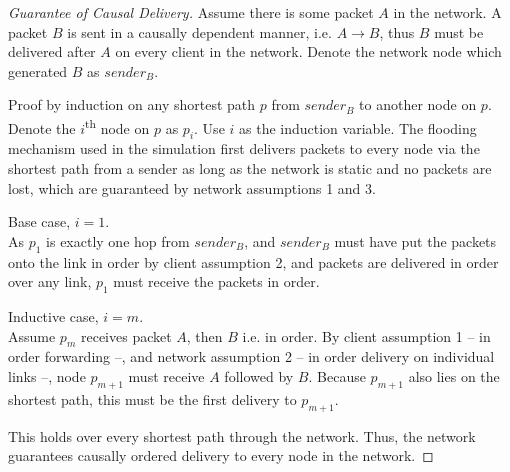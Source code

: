 \documentclass[12pt,a4paper,twoside,openright]{report}
\begin{document}
		\begin{proof}[Guarantee of Causal Delivery]
		
		Assume there is some packet $A$ in the network. A packet $B$ is sent in a causally dependent manner, i.e. $A \rightarrow B$, thus $B$ must be delivered after $A$ on every client in the network. Denote the network node which generated $B$ as $sender_B$.
		
		Proof by induction on any shortest path $p$ from $sender_B$ to another node on $p$. Denote the $i$\textsuperscript{th} node on $p$ as $p_i$. Use $i$ as the induction variable. The flooding mechanism used in the simulation first delivers packets to every node via the shortest path from a sender as long as the network is static and no packets are lost, which are guaranteed by network assumptions 1 and 3.
		
		Base case, $i = 1$.\\
		As $p_1$ is exactly one hop from $sender_B$, and $sender_B$ must have put the packets onto the link in order by client assumption 2, and packets are delivered in order over any link, $p_1$ must receive the packets in order.
		
		Inductive case, $i = m$.\\
		Assume $p_m$ receives packet $A$, then $B$ i.e. in order. By client assumption 1 -- in order forwarding --, and network assumption 2 -- in order delivery on individual links --, node $p_{m+1}$ must receive $A$ followed by $B$. Because $p_{m+1}$ also lies on the shortest path, this must be the first delivery to $p_{m+1}$.
		
		This holds over every shortest path through the network. Thus, the network guarantees causally ordered delivery to every node in the network.
		
		
		

\end{proof}
\end{document}
